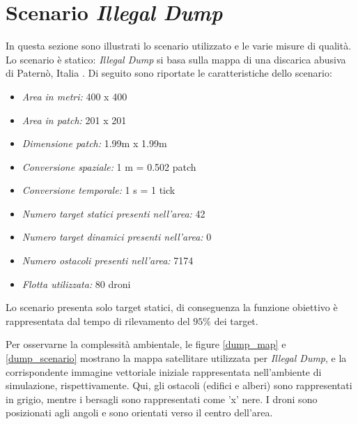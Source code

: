 \section{Scenario \textit{Illegal Dump}}

In questa sezione sono illustrati lo scenario utilizzato e le varie misure di qualità. 
Lo scenario è statico: \textit{Illegal Dump} si basa sulla mappa di una discarica abusiva di Paternò, Italia \cite{trashout2018}.
Di seguito sono riportate le caratteristiche dello scenario:

\begin{itemize}
    \item \textit{Area in metri:} 400 x 400
    \item \textit{Area in patch:} 201 x 201
    \item \textit{Dimensione patch:} 1.99m x 1.99m
    \item \textit{Conversione spaziale:} 1 m = 0.502 patch
    \item \textit{Conversione temporale:} 1 s = 1 tick
    \item \textit{Numero target statici presenti nell'area:} 42
    \item \textit{Numero target dinamici presenti nell'area:} 0
    \item \textit{Numero ostacoli presenti nell'area:} 7174
    \item \textit{Flotta utilizzata:} 80 droni
\end{itemize}

Lo scenario presenta solo target statici, di conseguenza la funzione obiettivo è rappresentata dal tempo di rilevamento del $95 \%$ dei target.

Per osservarne la complessità ambientale, le figure \ref{dump_map} e \ref{dump_scenario} mostrano la mappa satellitare utilizzata per \textit{Illegal Dump}, e la corrispondente immagine vettoriale iniziale rappresentata nell'ambiente di simulazione, rispettivamente. 
Qui, gli ostacoli (edifici e alberi) sono rappresentati in grigio, mentre i bersagli sono rappresentati come 'x' nere. 
I droni sono posizionati agli angoli e sono orientati verso il centro dell'area.

